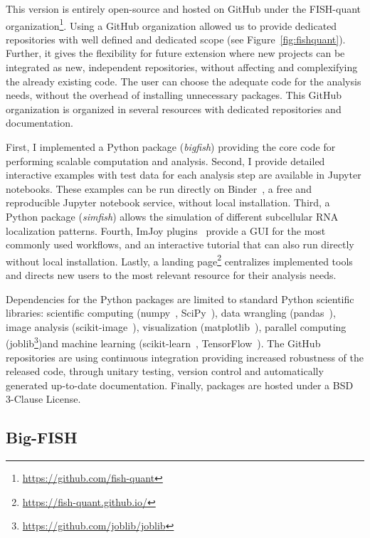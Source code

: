 This version is entirely open-source and hosted on GitHub under the FISH-quant organization\footnote{\url{https://github.com/fish-quant}}.
Using a GitHub organization allowed us to provide dedicated repositories with well defined and dedicated scope (see Figure~\ref{fig:fishquant}).
Further, it gives the flexibility for future extension where new projects can be integrated as new, independent repositories, without affecting and complexifying the already existing code.
The user can choose the adequate code for the analysis needs, without the overhead of installing unnecessary packages.
This GitHub organization is organized in several resources with dedicated repositories and documentation.

First, I implemented a Python package (\emph{bigfish}) providing the core code for performing scalable computation and analysis.
Second, I provide detailed interactive examples with test data for each analysis step are available in Jupyter notebooks. These examples can be run directly on Binder~\cite{Jupyter2018Binder2}, a free and reproducible Jupyter notebook service, without local installation.
Third, a Python package (\emph{simfish}) allows the simulation of different subcellular \ac{RNA} localization patterns.
Fourth, ImJoy plugins~\cite{ouyang_imjoy_2019} provide a \ac{GUI} for the most commonly used workflows, and an interactive tutorial that can also run directly without local installation.
Lastly, a landing page\footnote{\url{https://fish-quant.github.io/}} centralizes implemented tools and directs new users to the most relevant resource for their analysis needs.

Dependencies for the Python packages are limited to standard Python scientific libraries: scientific computing (numpy~\cite{2020NumPy}, SciPy~\cite{2020SciPy}), data wrangling (pandas~\cite{mckinney_pandas_2010}), image analysis (scikit-image~\cite{walt_scikit-image_2014}), visualization (matplotlib~\cite{hunter_matplotlib_2007}), parallel computing (joblib\footnote{\url{https://github.com/joblib/joblib}})and machine learning (scikit-learn~\cite{pedregosa11a_scikitlearn}, TensorFlow~\cite{tensorflow_2015}).
The GitHub repositories are using continuous integration providing increased robustness of the released code, through unitary testing, version control and automatically generated up-to-date documentation.
Finally, packages are hosted under a BSD 3-Clause License.

\subsection{Big-FISH}
\label{subsec:bigfish}

